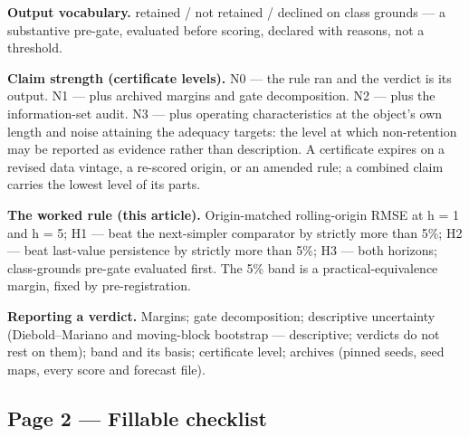 \documentclass[11pt]{article}
\begin{document}
\textbf{Output vocabulary.} retained / not retained / declined on class
grounds --- a substantive pre-gate, evaluated before scoring, declared
with reasons, not a threshold.

\textbf{Claim strength (certificate levels).} N0 --- the rule ran and
the verdict is its output. N1 --- plus archived margins and gate
decomposition. N2 --- plus the information-set audit. N3 --- plus
operating characteristics at the object's own length and noise attaining
the adequacy targets: the level at which non-retention may be reported
as evidence rather than description. A certificate expires on a revised
data vintage, a re-scored origin, or an amended rule; a combined claim
carries the lowest level of its parts.

\textbf{The worked rule (this article).} Origin-matched rolling-origin
RMSE at h = 1 and h = 5; H1 --- beat the next-simpler comparator by
strictly more than 5\%; H2 --- beat last-value persistence by strictly
more than 5\%; H3 --- both horizons; class-grounds pre-gate evaluated
first. The 5\% band is a practical-equivalence margin, fixed by
pre-registration.

\textbf{Reporting a verdict.} Margins; gate decomposition; descriptive
uncertainty (Diebold--Mariano and moving-block bootstrap ---
descriptive; verdicts do not rest on them); band and its basis;
certificate level; archives (pinned seeds, seed maps, every score and
forecast file).

\subsection{Page 2 --- Fillable
checklist}\label{page-2-fillable-checklist}
\end{document}
